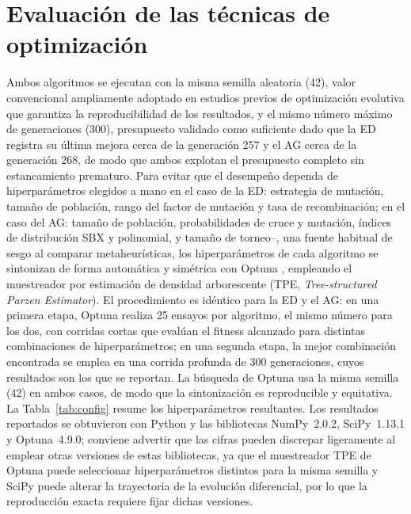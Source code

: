 \documentclass[conference]{IEEEtran}
\begin{document}
\section{Evaluación de las técnicas de optimización}
Ambos algoritmos se ejecutan con la misma semilla aleatoria (42), valor
convencional ampliamente adoptado en estudios previos de optimización evolutiva
que garantiza la reproducibilidad de los resultados, y el mismo número máximo de
generaciones (300), presupuesto validado como suficiente dado que la ED registra
su última mejora cerca de la generación 257 y el AG cerca de la generación 268,
de modo que ambos explotan el presupuesto completo sin estancamiento prematuro.
Para evitar que el desempeño dependa de hiperparámetros elegidos a mano
en el caso de la ED: estrategia de mutación, tamaño de población, rango del
factor de mutación y tasa de recombinación; en el caso del AG: tamaño de
población, probabilidades de cruce y mutación, índices de distribución SBX y
polinomial, y tamaño de torneo--, una fuente habitual de sesgo al comparar
metaheurísticas, los hiperparámetros de cada algoritmo se sintonizan de forma
automática y simétrica con Optuna \cite{ref_optuna}, empleando el muestreador por
estimación de densidad arborescente (TPE, \emph{Tree-structured Parzen
Estimator}). El procedimiento es idéntico para la ED y el AG: en una primera
etapa, Optuna realiza 25 ensayos por algoritmo, el mismo número para los dos, con
corridas cortas que evalúan el fitness alcanzado para distintas combinaciones de
hiperparámetros; en una segunda etapa, la mejor combinación encontrada se emplea
en una corrida profunda de 300 generaciones, cuyos resultados son los que se
reportan. La búsqueda de Optuna usa la misma semilla (42) en ambos casos, de modo
que la sintonización es reproducible y equitativa. La Tabla~\ref{tab:config}
resume los hiperparámetros resultantes. Los resultados reportados se obtuvieron
con Python y las bibliotecas NumPy~2.0.2, SciPy~1.13.1 y Optuna~4.9.0; conviene
advertir que las cifras pueden discrepar ligeramente al emplear otras versiones
de estas bibliotecas, ya que el muestreador TPE de Optuna puede seleccionar
hiperparámetros distintos para la misma semilla y SciPy puede alterar la
trayectoria de la evolución diferencial, por lo que la reproducción exacta
requiere fijar dichas versiones.
\end{document}
